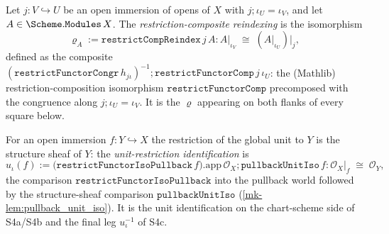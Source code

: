 \begin{definition}\label{mk-def:restrictcompreindex}
  \leanok

  Let \(j : V \hookrightarrow U\) be an open immersion of opens of \(X\) with
  \(j \mathbin{;} \iota_U = \iota_V\), and let \(A \in \Scheme.\mathtt{Modules}\,X\). The
  \emph{restriction-composite reindexing} is the isomorphism
  \[
    \varrho_A := \mathtt{restrictCompReindex}\,j\,A :
      A|_{\iota_V} \;\cong\; (A|_{\iota_U})\big|_j ,
  \]
  defined as the composite \((\mathtt{restrictFunctorCongr}\,h_{j\iota})^{-1} \mathbin{;}
  \mathtt{restrictFunctorComp}\,j\,\iota_U\): the (Mathlib) restriction-composition isomorphism
  \(\mathtt{restrictFunctorComp}\) precomposed with the congruence along
  \(j \mathbin{;} \iota_U = \iota_V\). It is the \(\varrho\) appearing on both flanks of every
  square below.
\end{definition}

\begin{definition}\label{mk-def:unitrestrictiso}
  \leanok

  For an open immersion \(f : Y \hookrightarrow X\) the restriction of the global unit to \(Y\) is
  the structure sheaf of \(Y\): the \emph{unit-restriction identification} is
  \[
    u_\iota(f) := \bigl(\mathtt{restrictFunctorIsoPullback}\,f\bigr).\mathrm{app}\,\mathcal{O}_X
      \mathbin{;} \mathtt{pullbackUnitIso}\,f :
      \mathcal{O}_X|_f \;\cong\; \mathcal{O}_Y ,
  \]
  the comparison \(\mathtt{restrictFunctorIsoPullback}\) into the pullback world followed by the
  structure-sheaf comparison \(\mathtt{pullbackUnitIso}\) (\ref{mk-lem:pullback_unit_iso}). It is the
  unit identification on the chart-scheme side of S4a/S4b and the final leg \(u_\iota^{-1}\) of S4c.
\end{definition}

